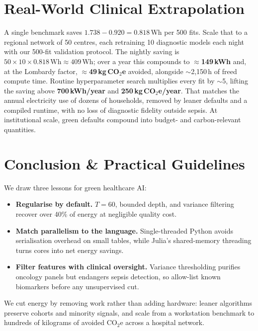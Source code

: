 \documentclass[11pt,a4paper]{article}
\begin{document}
\section{Real-World Clinical Extrapolation}
\label{sec:extrapolation}
A single benchmark saves $1.738-0.920=0.818$\,Wh per 500 fits. Scale that to
a regional network of 50 centres, each retraining 10 diagnostic models each
night with our 500-fit validation protocol. The nightly saving is
$50\times10\times0.818\,\mathrm{Wh}\approx409$\,Wh; over a year this compounds
to \textbf{$\approx$149\,kWh} and, at the Lombardy factor,
\textbf{$\approx$49\,kg\,CO$_{2}$e} avoided, alongside $\sim$2{,}150\,h of
freed compute time. Routine hyperparameter search multiplies every fit by
$\sim$5, lifting the saving above \textbf{700\,kWh/year} and
\textbf{250\,kg\,CO$_{2}$e/year}. That matches the annual electricity use of
dozens of households, removed by leaner defaults and a compiled runtime, with
no loss of diagnostic fidelity outside sepsis. At institutional scale, green
defaults compound into budget- and carbon-relevant quantities.

\section{Conclusion \& Practical Guidelines}
We draw three lessons for green healthcare AI:
\begin{itemize}
\item \textbf{Regularise by default.} $T{=}60$, bounded depth, and variance filtering recover over 40\% of energy at negligible quality cost.
\item \textbf{Match parallelism to the language.} Single-threaded Python avoids serialisation overhead on small tables, while Julia's shared-memory threading turns cores into net energy savings.
\item \textbf{Filter features with clinical oversight.} Variance thresholding purifies oncology panels but endangers sepsis detection, so allow-list known biomarkers before any unsupervised cut.
\end{itemize}
We cut energy by removing work rather than adding hardware: leaner algorithms preserve cohorts and minority signals, and scale from a workstation benchmark to hundreds of kilograms of avoided CO$_{2}$e across a hospital network.
\end{document}
